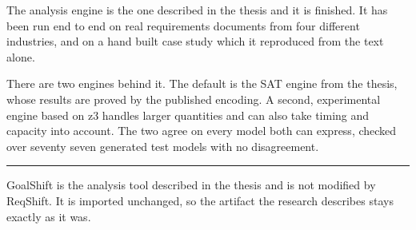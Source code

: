 \documentclass[11pt,a4paper]{article}
\begin{document}
The analysis engine is the one described in the thesis and it is finished. It has been
run end to end on real requirements documents from four different industries, and on a
hand built case study which it reproduced from the text alone.

There are two engines behind it. The default is the SAT engine from the thesis, whose
results are proved by the published encoding. A second, experimental engine based on
z3 handles larger quantities and can also take timing and capacity into account. The
two agree on every model both can express, checked over seventy seven generated test
models with no disagreement.

\vspace{12pt}
\noindent\textcolor{rule}{\rule{\linewidth}{0.6pt}}
\vspace{2pt}

{\footnotesize\color{muted}
GoalShift is the analysis tool described in the thesis and is not modified by ReqShift.
It is imported unchanged, so the artifact the research describes stays exactly as it
was.}
\end{document}
